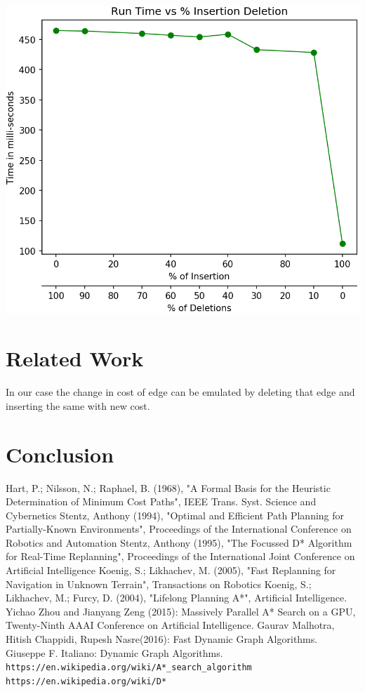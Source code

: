 \documentclass[a4paper]{article}
\begin{document}
\begin{center}
\includegraphics[scale=0.45]{img/IDvK.png}        
\end{center}

\section{Related Work}
In our case the change in cost of edge can be emulated by deleting that edge and inserting the same with new cost.

\section{Conclusion}




\begin{thebibliography}{} 
     Hart, P.; Nilsson, N.; Raphael, B. (1968), "A Formal Basis for the Heuristic Determination of Minimum Cost Paths", IEEE Trans. Syst. Science and Cybernetics
    Stentz, Anthony (1994), "Optimal and Efficient Path Planning for Partially-Known Environments", Proceedings of the International Conference on Robotics and Automation
    Stentz, Anthony (1995), "The Focussed D* Algorithm for Real-Time Replanning", Proceedings of the International Joint Conference on Artificial Intelligence
    Koenig, S.; Likhachev, M. (2005), "Fast Replanning for Navigation in Unknown Terrain", Transactions on Robotics
    Koenig, S.; Likhachev, M.; Furcy, D. (2004), "Lifelong Planning A*", Artificial Intelligence.
    Yichao Zhou and Jianyang Zeng (2015): Massively Parallel A* Search on a GPU, Twenty-Ninth AAAI Conference on Artificial Intelligence.
    Gaurav Malhotra, Hitish Chappidi, Rupesh Nasre(2016): Fast Dynamic Graph Algorithms.
    Giuseppe F. Italiano: Dynamic Graph Algorithms.
    \texttt{https://en.wikipedia.org/wiki/A*\_search\_algorithm}
    \texttt{https://en.wikipedia.org/wiki/D*}
        

\end{thebibliography}
\end{document}
